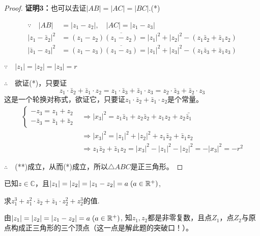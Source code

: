 \begin{proof}
\begin{minipage}{.4\textwidth}
\begin{tikzpicture}[>=stealth, scale=1.3]
\end{tikzpicture}
\end{minipage}

\textbf{证明3：}也可以去证$|AB|=|AC|=|BC|$.\hfill (*)

\[\begin{split}
    \because\quad |AB|&=|z_1-z_2|,\quad |AC|=|z_1-z_3|\\
|z_1-\bar z_2|^2&=(z_1-z_2)\overline{(z_1-z_2)}=|z_1|^2+|z_2|^2-(z_1\bar z_2+\bar z_1z_2)\\
|\bar z_1-z_3|^2&=(z_1-z_3)\overline{(z_1-z_3)}=|z_1|^2+|z_3|^2-(z_1\bar z_3+\bar z_1z_3)    
\end{split}\]

$\because\quad |z_1|=|z_2|=|z_3|=r$

$\therefore\quad$欲证(*)，只要证
\begin{equation}
 z_1\cdot \bar z_2+\bar z_1\cdot z_2=z_1\cdot \bar z_3+\bar z_1\cdot z_3=z_2\cdot \bar z_3+\bar z_2\cdot z_3 \tag{**} 
\end{equation}
这是一个轮换对称式，欲证它，只要证$z_1\cdot \bar z_2+\bar z_1\cdot z_2$是个常量。
\[\begin{split}
\begin{cases}
    -z_3=z_1+z_2\\
    -\bar z_3=\bar z_1+\bar z_2
\end{cases}&\Rightarrow |x_3|^2 =z_1\bar z_1+z_2\bar z_2+z_1 z_2+z_2\bar{\bar z_1}\\
&\Rightarrow |x_3|^2 =|z_1|^2+|z_2|^2+z_1 \bar z_2+\bar z_1 z_2\\
&\Rightarrow z_1 \bar z_2+\bar z_1 z_2=|x_3|^2-|z_1|^2-|z_2|^2=-|x_3|^2=-r^2
\end{split}\]

$\therefore\quad $(**)成立，从而(*)成立，所以$\triangle ABC$是正三角形。
\end{proof}

\begin{example}
 已知$z\in\mathbb{C}$，且$|z_1|=|z_2|=|z_1-z_2|=a\; (a\in\R^+)$,

 求$z^3_1+z^2_1\cdot \bar z_2+\bar z_1\cdot z^2_2+z^3_2$的值.
\end{example}

\begin{analyze}
由$|z_1|=|z_2|=|z_1-z_2|=a\; (a\in\R^+)$, 知$z_1,z_2$都是非零复数，且点$Z_1$，点$Z_2$与原点构成正三角形的三个顶点（这一点是解此题的突破口！）。 
\end{analyze}

